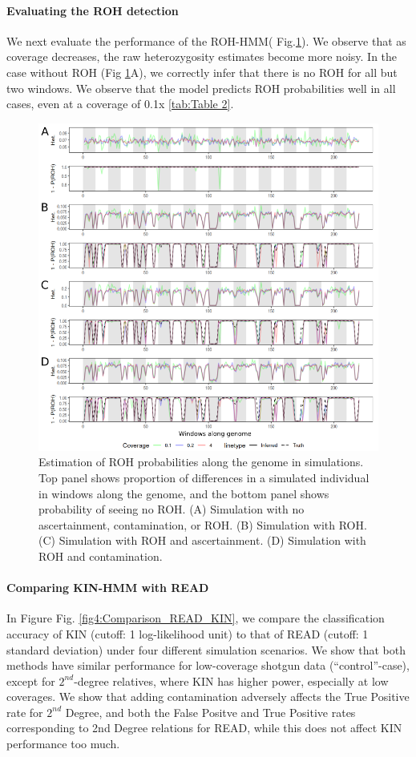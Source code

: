 \documentclass[12pt, letterpaper]{article}
\begin{document}
\paragraph{Evaluating the ROH detection}
We next evaluate the performance of the ROH-HMM( Fig.\ref{fig2:ROH}). We observe that as coverage decreases, the raw heterozygosity estimates become more noisy. In the case without ROH (Fig \ref{fig2:ROH}A), we correctly infer that there is no ROH for all but two windows. We observe that the model predicts ROH probabilities well in all cases, even at a coverage of 0.1x \ref{tab:Table 2}. 


\begin{figure}[h!]
    \includegraphics[width=16cm]{plots/inkscape_finalImg/ROHplot_final.png}
    \centering
    \caption{Estimation of ROH probabilities along the genome in simulations. Top panel shows proportion of differences in a simulated individual in windows along the genome, and the bottom panel shows probability of seeing no ROH. (A) Simulation with no ascertainment, contamination, or ROH. (B) Simulation with ROH. (C) Simulation with ROH and ascertainment. (D) Simulation with ROH and contamination.}
    \label{fig2:ROH}
\end{figure}

\paragraph{Comparing KIN-HMM with READ}
In Figure Fig. \ref{fig4:Comparison_READ_KIN}, we compare the classification accuracy of KIN (cutoff: 1 log-likelihood unit) to that of READ (cutoff: 1 standard deviation)  under four different simulation scenarios. We show that both methods have similar performance for low-coverage shotgun data (``control''-case),  except for $2^{nd}$-degree relatives, where KIN has higher power, especially at low coverages. We show that adding contamination adversely affects the True Positive rate for $2^{nd}$ Degree, and both the False Positve and True Positive rates corresponding to 2nd Degree relations for READ, while this does not affect KIN performance too much.
\end{document}
